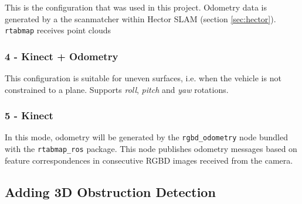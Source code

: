 This is the configuration that was used in this project. Odometry data is generated by a the scanmatcher within Hector SLAM (section \ref{sec:hector}). \texttt{rtabmap} receives point clouds

\subsubsection{4 - Kinect + Odometry}

This configuration is suitable for uneven surfaces, i.e. when the vehicle is not constrained to a plane. Supports \textit{roll}, \textit{pitch} and \textit{yaw} rotations.

\subsubsection{5 - Kinect}

In this mode, odometry will be generated by the \texttt{rgbd\_odometry} node bundled with the \texttt{rtabmap\_ros} package. This node publishes odometry messages based on feature correspondences in consecutive RGBD images received from the camera.


\subsection{Adding 3D Obstruction Detection}

